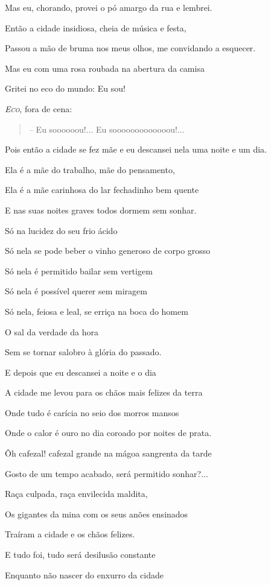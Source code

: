 Mas eu, chorando, provei o pó amargo da rua e lembrei.

Então a cidade insidiosa, cheia de música e festa,

Passou a mão de bruma nos meus olhos, me convidando a esquecer.

Mas eu com uma rosa roubada na abertura da camisa

Gritei no eco do mundo: Eu sou!

\emph{\textsc{Eco}}, fora de cena:

\begin{quote}
\emph{--} Eu soooooou!... Eu sooooooooooooou!...
\end{quote}

Pois então a cidade se fez mãe e eu descansei nela uma noite e um dia.

Ela é a mãe do trabalho, mãe do pensamento,

Ela é a mãe carinhosa do lar fechadinho bem quente

E nas suas noites graves todos dormem sem sonhar.

Só na lucidez do seu frio ácido

Só nela se pode beber o vinho generoso de corpo grosso

Só nela é permitido bailar sem vertigem

Só nela é possível querer sem miragem

Só nela, feiosa e leal, se erriça na boca do homem

O sal da verdade da hora

Sem se tornar salobro à glória do passado.

E depois que eu descansei a noite e o dia

A cidade me levou para os chãos mais felizes da terra

Onde tudo é carícia no seio dos morros mansos

Onde o calor é ouro no dia coroado por noites de prata.

Ôh cafezal! cafezal grande na mágoa sangrenta da tarde

Gosto de um tempo acabado, será permitido sonhar?...

Raça culpada, raça envilecida maldita,

Os gigantes da mina com os seus anões ensinados

Traíram a cidade e os chãos felizes.

E tudo foi, tudo será desilusão constante

Enquanto não nascer do enxurro da cidade

